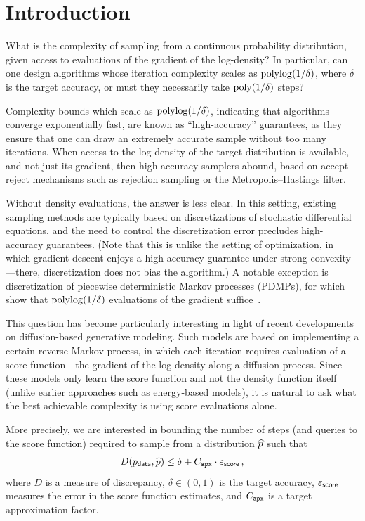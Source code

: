 \documentclass{article} %
\begin{document}
\section{Introduction}


What is the complexity of sampling from a continuous probability distribution, given access to evaluations of the gradient of the log-density?
In particular, can one design algorithms whose iteration complexity scales as $\mathrm{polylog}(1/\delta)$, where $\delta$ is the target accuracy, or must they necessarily take $\mathrm{poly}(1/\delta)$ steps?

Complexity bounds which scale as $\mathrm{polylog}(1/\delta)$, indicating that algorithms converge exponentially fast, are known as ``high-accuracy'' guarantees, as they ensure that one can draw an extremely accurate sample without too many iterations.
When access to the log-density of the target distribution is available, and not just its gradient, then high-accuracy samplers abound, based on accept-reject mechanisms such as rejection sampling or the Metropolis--Hastings filter.

Without density evaluations, the answer is less clear.
In this setting, existing sampling methods are typically based on discretizations of stochastic differential equations, and the need to control the discretization error precludes high-accuracy guarantees.
(Note that this is unlike the setting of optimization, in which gradient descent enjoys a high-accuracy guarantee under strong convexity---there, discretization does not bias the algorithm.)
A notable exception is discretization of piecewise deterministic Markov processes (PDMPs), for which~\citet{LuWan22Zigzag} show that $\mathrm{polylog}(1/\delta)$ evaluations of the gradient suffice~.

This question has become particularly interesting in light of recent developments on diffusion-based generative modeling.
Such models are based on implementing a certain reverse Markov process, in which each iteration requires evaluation of a score function---the gradient of the log-density along a diffusion process.
Since these models only learn the score function and not the density function itself (unlike earlier approaches such as energy-based models), it is natural to ask what the best achievable complexity is using score evaluations alone.

More precisely, we are interested in bounding the number of steps (and queries to the score function) required to sample from a distribution $\widehat{p}$ such that
\begin{align}\label{eq:goal}
  D(p_{\mathsf{data}},\widehat{p})\leq \delta+ C_{\texttt{apx}}\cdot  \varepsilon_{\mathsf{score}}\,,
\end{align}
where $D$ is a measure of discrepancy, $\delta\in(0,1)$ is the target accuracy, $\varepsilon_{\mathsf{score}}$ measures the error in the score function estimates, and $C_{\texttt{apx}}$ is a target approximation factor.
\end{document}
